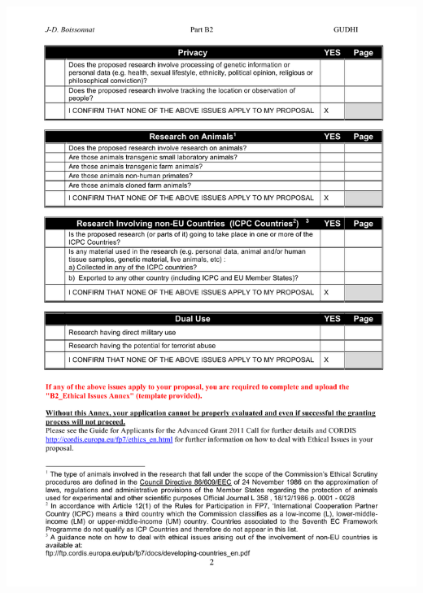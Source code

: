 \documentclass[a4paper, 11pt]{article}
\begin{document}
\begin{center}
\includegraphics[width=\textwidth]{ethics3}
\end{center}
\end{document}
